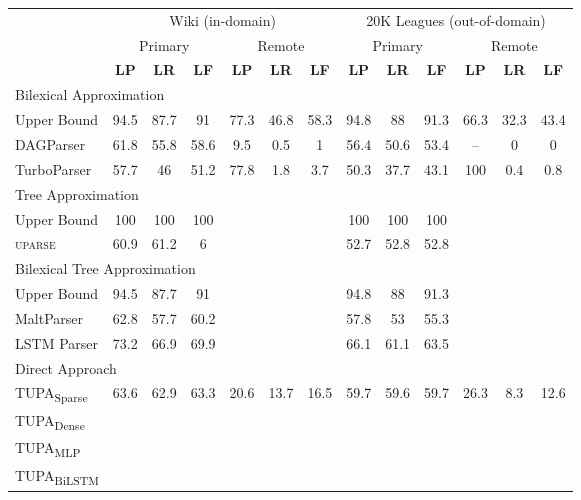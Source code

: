 \documentclass[11pt,a4paper]{article}
\newcommand{\parser}[1]{TUPA\textsubscript{#1}}
\begin{document}
\begin{table*}[ht]
\begin{tabular}{l|ccc|ccc||ccc|ccc}
& \multicolumn{6}{c||}{Wiki (in-domain)} & \multicolumn{6}{c}{20K Leagues (out-of-domain)} \\
& \multicolumn{3}{c|}{Primary} & \multicolumn{3}{c||}{Remote}
& \multicolumn{3}{c|}{Primary} & \multicolumn{3}{c}{Remote} \\
& \textbf{LP} & \textbf{LR} & \textbf{LF} & \textbf{LP} & \textbf{LR} & \textbf{LF}
& \textbf{LP} & \textbf{LR} & \textbf{LF} & \textbf{LP} & \textbf{LR} & \textbf{LF} \\
\hline
\multicolumn{4}{l}{\rule{0pt}{2ex} \footnotesize Bilexical Approximation} \\
\small Upper Bound
& \small 94.5 & \small 87.7 & \small 91 & \small 77.3 & \small 46.8 & \small 58.3
& \small 94.8 & \small 88 & \small 91.3 & \small 66.3 & \small 32.3 & \small 43.4 \\
DAGParser
& 61.8 & 55.8 & 58.6 & 9.5 & 0.5 & 1
& 56.4 & 50.6 & 53.4 & -- & 0 & 0 \\
TurboParser
& 57.7 & 46 & 51.2 & 77.8 & 1.8 & 3.7
& 50.3 & 37.7 & 43.1 & 100 & 0.4 & 0.8 \\
\hline
\multicolumn{4}{l}{\rule{0pt}{2ex} \footnotesize Tree Approximation} \\
\small Upper Bound
& \small 100 & \small 100 & \small 100 & & &
& \small 100 & \small 100 & \small 100 \\
\textsc{uparse}
& 60.9 & 61.2 & 6 & & &
& 52.7 & 52.8 & 52.8 \\
\hline
\multicolumn{4}{l}{\rule{0pt}{2ex} \footnotesize Bilexical Tree Approximation} \\
\small Upper Bound
& \small 94.5 & \small 87.7 & \small 91 & & &
& \small 94.8 & \small 88 & \small 91.3 \\
MaltParser
& 62.8 & 57.7 & 60.2 & & &
& 57.8 & 53 & 55.3 \\
LSTM Parser
& 73.2 & 66.9 & 69.9 & & &
& 66.1 & 61.1 & 63.5 \\
\hline
\multicolumn{4}{l}{\rule{0pt}{2ex} \footnotesize Direct Approach} \\
\parser{Sparse}
& 63.6 & 62.9 & 63.3 & 20.6 & 13.7 & 16.5
& 59.7 & 59.6 & 59.7 & 26.3 & 8.3 & 12.6 \\
\parser{Dense} 
& 
& \\
\parser{MLP}
& 
& \\
\parser{BiLSTM}
& 
& 
\end{tabular}
\caption{\label{table:results}
  Main experimental results in percents, on the \textit{Wiki} test set (left)
  and the \textit{20K Leagues} set (right).
  Columns correspond to labeled precision, recall and F-score,
  for both primary and remote edges.
  \parser{BiLSTM} obtains the highest scores in all metrics, surpassing the bilexical parsers
  and the other classifiers.
}
\end{table*}
\end{document}
